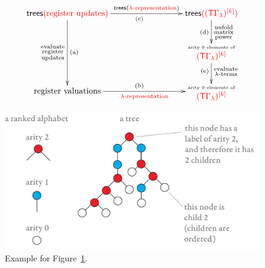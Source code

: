 \begin{figure}[]
    \centering
    \begin{align*}
        \xymatrix@C=3cm{
            \trees \ranked{\text{(register updates)}} 
            \ar[dd]_{\substack{\text{evaluate}\\\text{register}\\\text{updates}}}^{\text{(a)}}
            \ar[r]^-{\trees(\text{\ranked{$\lambda$-representation}})}_{\text{(c)}}
            &
            \trees \ranked{(\mati k{(\tmonad \Gamma_\lambda)})}
            \ar[d]^{\substack{\text{unfold}\\\text{matrix}\\\text{power}}}_{\text{(d)}} \\
            & 
            \txt{{\tiny arity 0 elements of }\\
            $
            \mati k {\ranked{(\tmonad \Gamma_\lambda)}}
            $}
            \ar[d]^{\substack{\text{evaluate}\\\text{$\lambda$-terms}}}_{\text{(e)}}\\
             \text{register valuations}
            \ar[r]_-{\ranked{\text{$\lambda$-representation}}}^{\text{(b)}}
            &
            \txt{{\tiny arity 0 elements of }\\
            $
            \mati k {\ranked{(\tmonad \Gamma_\lambda)}}
            $}
        }
    \end{align*} 
    \caption{}
    \label{fig:lambda-representation-diagram}
\end{figure}
\begin{figure}[]   
    \hspace{-0.5cm}
    \includegraphics[page=120,scale=0.34]{pics}
    \caption{Example for Figure~\ref{fig:lambda-representation-diagram}.}
    \label{fig:lambda-representation-proof}
\end{figure}
 
